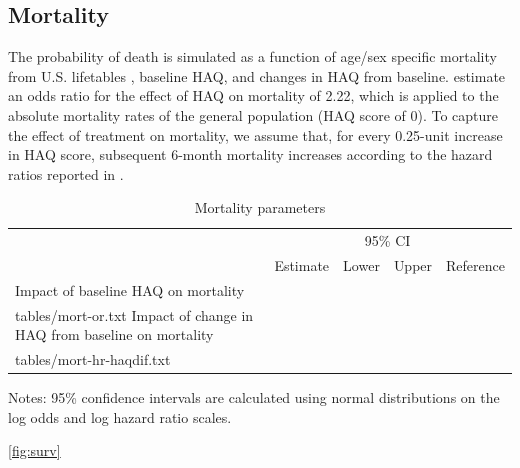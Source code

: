 \documentclass[11pt,final,fleqn]{article}\usepackage[]{graphicx}\usepackage[]{color}
\makeatletter
\theoremstyle{plain}
\newcommand*\ExpandableInput[1]{\@@input#1 }
\makeatother
\begin{document}
\subsection{Mortality}
The probability of death is simulated as a function of age/sex specific mortality from U.S. lifetables \citep{arias2015united}, baseline HAQ, and changes in HAQ from baseline. \citet{wolfe2003predicting} estimate an odds ratio for the effect of HAQ on mortality of 2.22, which is applied to the absolute mortality rates of the general population (HAQ score of 0). To capture
the effect of treatment on mortality, we assume that, for every 0.25-unit increase in HAQ score, subsequent 6-month mortality increases according to the hazard ratios reported in \citet{michaud2012mortality}.



\begin{table}[!ht]
\begin{center}
\begin{threeparttable}
\caption{Mortality parameters} \label{tbl:mortpars}
\footnotesize
\begin{tabularx}{\textwidth}{@{\extracolsep{\fill}}lcccc}
\hline
\multicolumn{2}{l}{} & \multicolumn{2}{c}{95\% CI} & \multicolumn{1}{l}{} \\
\cmidrule{3-4} 
\multicolumn{1}{l}{} & \multicolumn{1}{l}{Estimate} & \multicolumn{1}{c}{Lower} & \multicolumn{1}{c}{Upper} & \multicolumn{1}{c}{Reference} \\
\hline
Impact of baseline HAQ on mortality \\
\ExpandableInput{tables/mort-or.txt}
Impact of change in HAQ from baseline on mortality\\
\ExpandableInput{tables/mort-hr-haqdif.txt}
\hline
\end{tabularx}
\scriptsize
Notes: 95\% confidence intervals are calculated using normal distributions on the log odds
and log hazard ratio scales. 
\end{threeparttable}
\end{center}
\end{table}

\autoref{fig:surv}
\end{document}
